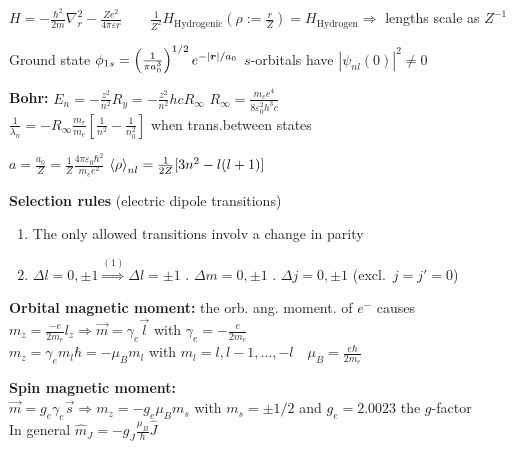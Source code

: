 
\begin{squishlist}
    \item $H = - \frac{\hbar^2}{2m}\nabla^2_r - \frac{Z e^2}{4 \pi \varepsilon r} \qquad  \frac{1}{Z^2}H_{\text{Hydrogenic}}\left(\rho:=\frac{r}{Z}\right) = H_{\text{Hydrogen}} \Longrightarrow$ lengths scale as $Z^{-1}$
    \item Ground state $\phi_{1s} = \left(\frac{1}{\pi a_0^3}\right)^{1/2} e^{-|\bm{r}|/a_0} $
    \squishsep $s$-orbitals have $\left|\psi_{nl}(0)\right|^2 \neq 0$
    \item \textbf{Bohr:} $E_n = - \frac{z^2}{n^2} R_y = - \frac{z^2}{n^2}h c R_{\infty}$ \quad $R_{\infty} = \frac{m_e e^4}{8 \varepsilon_0^2 h^3 c}$\\
     $\frac{1}{\lambda_n} = - R_{\infty} \frac{m_r}{m_e} \left[ \frac{1}{n^2} - \frac{1}{n_0^2}\right]$ when trans.between states
    
    \item $ a = \frac{a_0}{Z} = \frac{1}{Z} \frac{4\pi \varepsilon_0 \hbar^2}{m_e e^2}$ 
    \squishsep $\braket{\rho}_{nl} = \frac{1}{2Z} [3n^2 - l(l+1)]$

    \item \textbf{Selection rules} (electric dipole transitions)
        \begin{enumerate}
            \item The only allowed transitions involv a change in parity
            \item $\Delta l = 0, \pm1 \overset{(1)}{\Longrightarrow} \Delta l = \pm 1$ . $\Delta m = 0, \pm 1$ . $\Delta j = 0,\pm 1$ (excl.\ $j=j'=0$)
        \end{enumerate}
    
        \item \textbf{Orbital magnetic moment:} the orb. ang. moment. of $e^-$ causes \\
        $m_z = \frac{-e}{2m_e}l_z \Longrightarrow \vec{m} = \gamma_e \vec{l}$ \quad with $\gamma_e = -\frac{e}{2m_e}$\\
        $m_z = \gamma_e m_l \hbar = -\mu_B m_l$ \quad with $m_l = l, l-1, \ldots, -l \quad \mu_B = \frac{e\hbar}{2m_e}$

        \item \textbf{Spin magnetic moment:} \\ $\vec{m} = g_e \gamma_e \vec{s} \Longrightarrow m_z = -g_e \mu_B m_s$ \quad with $m_s=\pm1/2$ and $g_e = 2.0023$ the $g$-factor \\
        In general $\hat{m}_J = - g_J \frac{\mu_B}{\hbar} \hat{J}$
    \end{squishlist} 
    
